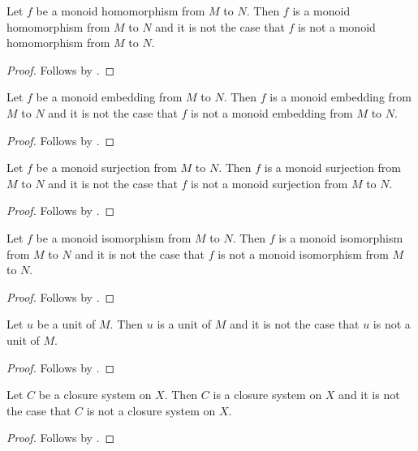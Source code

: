 \begin{proposition}\label{spike_use_monoid_hom}
    Let $f$ be a monoid homomorphism from $M$ to $N$.
    Then $f$ is a monoid homomorphism from $M$ to $N$ and it is not the case
        that $f$ is not a monoid homomorphism from $M$ to $N$.
\end{proposition}
\begin{proof} Follows by \auto. \end{proof}

\begin{proposition}\label{spike_use_monoid_embedding}
    Let $f$ be a monoid embedding from $M$ to $N$.
    Then $f$ is a monoid embedding from $M$ to $N$ and it is not the case
        that $f$ is not a monoid embedding from $M$ to $N$.
\end{proposition}
\begin{proof} Follows by \auto. \end{proof}

\begin{proposition}\label{spike_use_monoid_surjection}
    Let $f$ be a monoid surjection from $M$ to $N$.
    Then $f$ is a monoid surjection from $M$ to $N$ and it is not the case
        that $f$ is not a monoid surjection from $M$ to $N$.
\end{proposition}
\begin{proof} Follows by \auto. \end{proof}

\begin{proposition}\label{spike_use_monoid_isomorphism}
    Let $f$ be a monoid isomorphism from $M$ to $N$.
    Then $f$ is a monoid isomorphism from $M$ to $N$ and it is not the case
        that $f$ is not a monoid isomorphism from $M$ to $N$.
\end{proposition}
\begin{proof} Follows by \auto. \end{proof}

\begin{proposition}\label{spike_use_monoid_unit}
    Let $u$ be a unit of $M$.
    Then $u$ is a unit of $M$ and it is not the case that
        $u$ is not a unit of $M$.
\end{proposition}
\begin{proof} Follows by \auto. \end{proof}

\begin{proposition}\label{spike_use_closure_system}
    Let $C$ be a closure system on $X$.
    Then $C$ is a closure system on $X$ and it is not the case that
        $C$ is not a closure system on $X$.
\end{proposition}
\begin{proof} Follows by \auto. \end{proof}

